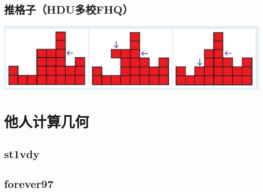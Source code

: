 \documentclass[twoside,a4paper]{article}
\begin{document}
\subsection{推格子（HDU多校FHQ）}
\includegraphics[width=15cm]{习题整理/推格子.jpg}






\section{他人计算几何}
\subsection{st1vdy}

\subsection{forever97}

\end{document}
